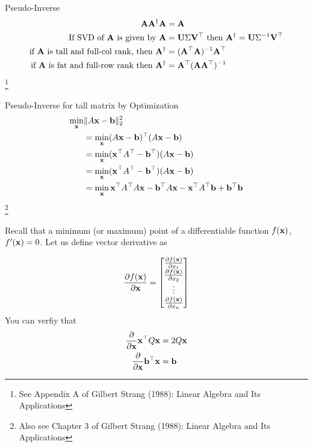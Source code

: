 \documentclass[times]{beamer}
\begin{document}
  \begin{frame}{Pseudo-Inverse}
    \begin{align}
      \mathbf{A} \mathbf{A}^\dagger \mathbf{A} &=  \mathbf{A} \\
      \text{If SVD of $\mathbf{A}$ is given by } \mathbf{A} &= \mathbf{U} \Sigma \mathbf{V}^\top 
      \text{ then } \mathbf{A}^\dagger = \mathbf{U} \Sigma^{-1} \mathbf{V}^\top \\
      \text{if } \mathbf{A} \text{ is tall and full-col rank, then } \mathbf{A}^\dagger &= (\mathbf{A}^\top \mathbf{A})^{-1} \mathbf{A}^\top \\
      \text{if } \mathbf{A} \text{ is fat and full-row rank then } \mathbf{A}^\dagger &=  \mathbf{A}^\top (\mathbf{A} \mathbf{A}^\top)^{-1}
    \end{align}\footnote{See Appendix A of Gilbert Strang (1988): Linear Algebra
    and Its Applications}

  \end{frame}
  \begin{frame}{Pseudo-Inverse for tall matrix by Optimization}
    \begin{align}
      \min_{\mathbf{x}} &\|A\mathbf{x} - \mathbf{b}\|_2^2
                    \\
      &= \min_{\mathbf{x}} (A\mathbf{x} - \mathbf{b})^\top (A\mathbf{x} - \mathbf{b})
      \\
      &= \min_{\mathbf{x}} (\mathbf{x}^\top A^\top - \mathbf{b}^\top) (A\mathbf{x} - \mathbf{b})
      \\
      &= \min_{\mathbf{x}} (\mathbf{x}^\top A^\top - \mathbf{b}^\top) (A\mathbf{x} - \mathbf{b})
      \\
      &= \min_{\mathbf{x}} \mathbf{x}^\top A^\top A\mathbf{x} - \mathbf{b}^\top A\mathbf{x} - \mathbf{x}^\top A^\top \mathbf{b} + \mathbf{b}^\top \mathbf{b}
    \end{align}\footnote{Also see Chapter 3 of Gilbert Strang (1988): Linear Algebra
      and Its Applications}
  \end{frame}

  \begin{frame}

    Recall that a minimum (or maximum) point of a differentiable function $f(\mathbf{x})$,
    $f'(\mathbf{x})  = 0$. Let us define vector derivative as

    \begin{align}
      \frac{\partial f(\mathbf{x})}{\partial \mathbf{x}} = \begin{bmatrix}
          \frac{\partial f(\mathbf{x})}{\partial x_1}
            \\
            \frac{\partial f(\mathbf{x})}{\partial x_2}
            \\
            \vdots
            \\
            \frac{\partial f(\mathbf{x})}{\partial x_n}
          \end{bmatrix}
    \end{align}
    You can verfiy that
    \begin{align}
      \frac{\partial }{\partial \mathbf{x}} \mathbf{x}^\top Q \mathbf{x} &= 2 Q\mathbf{x}
      \\
      \frac{\partial }{\partial \mathbf{x}} \mathbf{b}^\top \mathbf{x} &= \mathbf{b}
      \end{align}
  \end{frame}
\end{document}
